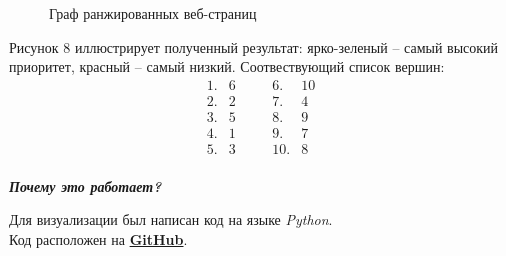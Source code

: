 \documentclass[a5paper, 10pt]{article}
\theoremstyle{definition}
\theoremstyle{plain}
\theoremstyle{remark}
\begin{document}
\begin{figure}[h!]
\caption{Граф ранжированных веб-страниц}
\end{figure}
\newpage
 Рисунок 8 иллюстрирует полученный результат: ярко-зеленый -- самый высокий приоритет, красный -- самый низкий. Соотвествующий список вершин:
\begin{equation*}
\begin{matrix}
1. & 6 & \,\,\,\,\,\, & 6. & 10\\
2. & 2  & \,\,\,\,\,\, & 7. & 4\\
3. & 5  & \,\,\,\,\,\, & 8. & 9\\
4. & 1  & \,\,\,\,\,\, & 9. & 7\\
5. & 3  & \,\,\,\,\,\, &10. & 8
\end{matrix}
\end{equation*}
\\
\textbf{\textit{Почему это работает?}}

\newpage
Для визуализации был написан код на языке \textit{Python}. \\
Код расположен на \href{https://github.com/a-nechaeva/practical_Linal/tree/main/lab4}{\textbf{GitHub}}.
\end{document}
